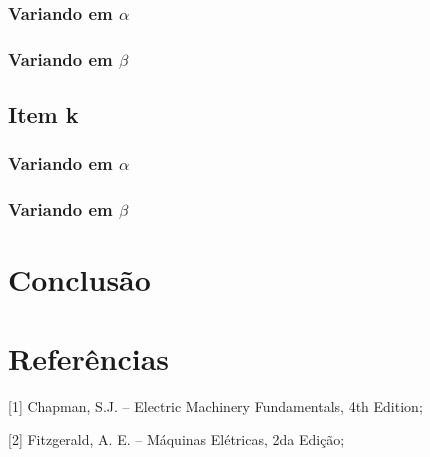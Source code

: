 \documentclass[a4paper, 12pt]{article}
\begin{document}
			\subsubsection{Variando em $\alpha$}
			\subsubsection{Variando em $\beta$}	
		\subsection{Item k}	
			\subsubsection{Variando em $\alpha$}
			\subsubsection{Variando em $\beta$}	
	\section{Conclusão}
		
	\newpage
	\section{Referências}
	
	[1] Chapman, S.J. -- Electric Machinery Fundamentals, 4th Edition;
	
	[2] Fitzgerald, A. E. -- Máquinas Elétricas, 2da Edição;
	
\end{document}
